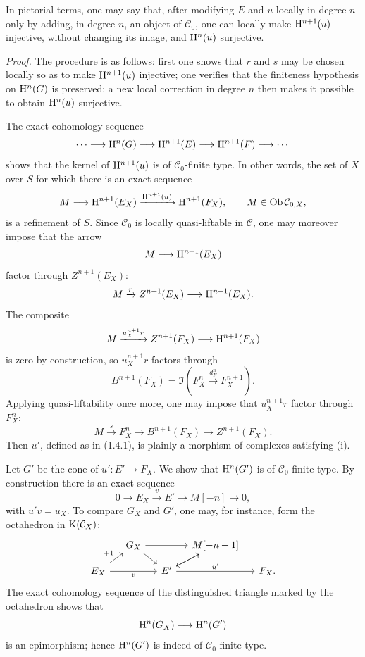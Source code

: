 \documentclass[11pt]{article}
\begin{document}
In pictorial terms, one may say that, after modifying \(E\) and \(u\) locally in degree \(n\) only by adding, in degree \(n\), an object of \(\mathcal C_0\), one can locally make \(\mathrm H^{n+1}(u)\) injective, without changing its image, and \(\mathrm H^n(u)\) surjective.

\emph{Proof.} The procedure is as follows: first one shows that \(r\) and \(s\) may be chosen locally so as to make \(\mathrm H^{n+1}(u)\) injective; one verifies that the finiteness hypothesis on \(\mathrm H^n(G)\) is preserved; a new local correction in degree \(n\) then makes it possible to obtain \(\mathrm H^n(u)\) surjective.

The exact cohomology sequence
\[
  \cdots\longrightarrow \mathrm H^n(G)\longrightarrow
  \mathrm H^{n+1}(E)\longrightarrow
  \mathrm H^{n+1}(F)\longrightarrow \cdots
\]
shows that the kernel of \(\mathrm H^{n+1}(u)\) is of \(\mathcal C_0\)-finite type. In other words, the set of \(X\) over \(S\) for which there is an exact sequence
\[
  M\longrightarrow \mathrm H^{n+1}(E_X)
  \xrightarrow{\mathrm H^{n+1}(u)}
  \mathrm H^{n+1}(F_X),
  \qquad M\in\operatorname{Ob}\mathcal C_{0,X},
\]
is a refinement of \(S\). Since \(\mathcal C_0\) is locally quasi-liftable in \(\mathcal C\), one may moreover impose that the arrow
\[
  M\longrightarrow \mathrm H^{n+1}(E_X)
\]
factor through \(Z^{n+1}(E_X)\):
\[
  M\xrightarrow{r} Z^{n+1}(E_X)\longrightarrow \mathrm H^{n+1}(E_X).
\]
The composite
\[
  M\xrightarrow{u_X^{n+1}r} Z^{n+1}(F_X)\longrightarrow \mathrm H^{n+1}(F_X)
\]
is zero by construction, so \(u_X^{n+1}r\) factors through
\[
  B^{n+1}(F_X)=\Im\!\left(F_X^n\xrightarrow{d_F^n}F_X^{n+1}\right).
\]
Applying quasi-liftability once more, one may impose that \(u_X^{n+1}r\) factor through \(F_X^n\):
\[
  M\xrightarrow{s}F_X^n\longrightarrow B^{n+1}(F_X)\longrightarrow Z^{n+1}(F_X).
\]
Then \(u'\), defined as in (1.4.1), is plainly a morphism of complexes satisfying (i).

Let \(G'\) be the cone of \(u':E'\to F_X\). We show that \(\mathrm H^n(G')\) is of \(\mathcal C_0\)-finite type. By construction there is an exact sequence
\[
  0\longrightarrow E_X\xrightarrow{v}E'\longrightarrow M[-n]\longrightarrow 0,
\]
with \(u'v=u_X\). To compare \(G_X\) and \(G'\), one may, for instance, form the octahedron in \(\mathrm K(\mathcal C_X)\):
\[
\begin{tikzcd}[column sep=small,row sep=small]
& G_X \arrow[rr] \arrow[dr] && M[-n+1] \arrow[dl]\\
E_X \arrow[ur,"+1"] \arrow[rr,"v"'] && E' \arrow[ur] \arrow[rr,"u'"] && F_X .
\end{tikzcd}
\]
The exact cohomology sequence of the distinguished triangle marked by the octahedron shows that
\[
  \mathrm H^n(G_X)\longrightarrow \mathrm H^n(G')
\]
is an epimorphism; hence \(\mathrm H^n(G')\) is indeed of \(\mathcal C_0\)-finite type.
\end{document}
